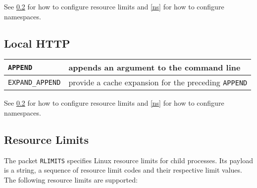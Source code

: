 \documentclass[a4paper,12pt]{article}
\begin{document}
See \ref{rlimits} for how to configure resource limits and \ref{ns}
for how to configure namespaces.

\subsection{Local HTTP}

\begin{longtable}{|l|p{8cm}|}
\hline

\verb|APPEND| & appends an argument to the command line \\

\hline

\verb|EXPAND_APPEND| & provide a cache expansion for the preceding
\verb|APPEND| \\

\hline
\end{longtable}

See \ref{rlimits} for how to configure resource limits and \ref{ns}
for how to configure namespaces.

\subsection{Resource Limits}
\label{rlimits}

The packet \verb|RLIMITS| specifies Linux resource limits for child
processes.  Its payload is a string, a sequence of resource limit
codes and their respective limit values.  The following resource
limits are supported:
\end{document}

